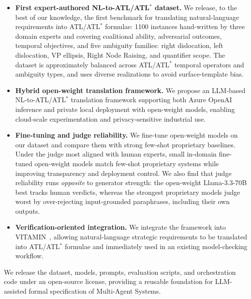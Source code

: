 \begin{itemize}
    \item \textbf{First expert-authored NL-to-ATL/ATL$^\ast$ dataset.}
    We release, to the best of our knowledge, the first benchmark for translating natural-language requirements into ATL/ATL$^\ast$ formulae: 1100 instances hand-written by three domain experts and covering coalitional ability, adversarial outcomes, temporal objectives, and five ambiguity families: right dislocation, left dislocation, VP ellipsis, Right Node Raising, and quantifier scope. The dataset is approximately balanced across ATL/ATL$^\ast$ temporal operators and ambiguity types, and uses diverse realizations to avoid surface-template bias. 

    \item \textbf{Hybrid open-weight translation framework.}
    We propose an LLM-based NL-to-ATL/ATL$^\ast$ translation framework supporting both Azure OpenAI inference and private local deployment with open-weight models, enabling cloud-scale experimentation and privacy-sensitive industrial use.

    \item \textbf{Fine-tuning and judge reliability.}
    We fine-tune open-weight models on our dataset and compare them with strong few-shot proprietary baselines. Under the judge most aligned with human experts, small in-domain fine-tuned open-weight models match few-shot proprietary systems while improving transparency and deployment control. We also find that judge reliability runs \emph{opposite} to generator strength: the open-weight Llama-3.3-70B best tracks human verdicts, whereas the strongest proprietary models judge worst by over-rejecting input-grounded paraphrases, including their own outputs.

    \item \textbf{Verification-oriented integration.}
    We integrate the framework into \textsc{VITAMIN}~\cite{DBLP:conf/ifaamas/0001M25}, allowing natural-language strategic requirements to be translated into ATL/ATL$^\ast$ formulae and immediately used in an existing model-checking workflow.
    
\end{itemize}
We release the dataset, models, prompts, evaluation scripts, and orchestration code under an open-source license, providing a reusable foundation for LLM-assisted formal specification of Multi-Agent Systems.

